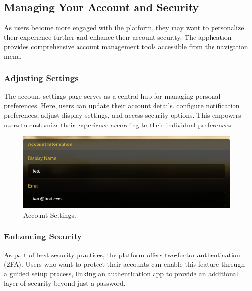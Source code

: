 \subsection{Managing Your Account and Security}

As users become more engaged with the platform, they may want to personalize their experience further and enhance their account security. The application provides comprehensive account management tools accessible from the navigation menu.

\subsubsection{Adjusting Settings} The account settings page serves as a central hub for managing personal preferences. Here, users can update their account details, configure notification preferences, adjust display settings, and access security options. This empowers users to customize their experience according to their individual preferences.

\begin{figure}[H]
    \centering
    \includegraphics[width=0.65\linewidth]{Figures/images/new_images/AccountInformation.png}
    \caption{Account Settings.} %
    \label{fig:account-settings-journey}
\end{figure}

\subsubsection{Enhancing Security} As part of best security practices, the platform offers two-factor authentication (2FA). Users who want to protect their accounts can enable this feature through a guided setup process, linking an authentication app to provide an additional layer of security beyond just a password.

